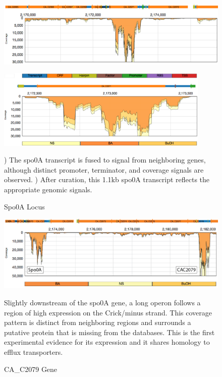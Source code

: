 \begin{figure}
\small
{\includegraphics[width=\textwidth,height=1.5in]{images/Assembly/Examples/Spo0A/Spo0A-locus.png}
\label{fig:5.18a}}
{\includegraphics[width=\textwidth,height=1.5in]{images/Assembly/Examples/Spo0A/Spo0A-curated.png}
\label{fig:5.18b}}
\caption{Spo0A Locus}
) The spo0A transcript is fused to signal from neighboring genes, although distinct promoter, terminator, and coverage signals are observed. ) After curation, this 1.1kb spo0A transcript reflects the appropriate genomic signals.
\end{figure}


\begin{figure}
\small
\includegraphics[width=\textwidth]{images/Assembly/Examples/Spo0A/CAC2079.png}
\caption{CA_C2079 Gene}\label{fig:5.19}
Slightly downstream of the spo0A gene, a long operon follows a region of high expression on the Crick/minus strand. This coverage pattern is distinct from neighboring regions and surrounds a putative protein that is missing from the databases. This is the first experimental evidence for its expression and it shares homology to efflux transporters.
\end{figure}

